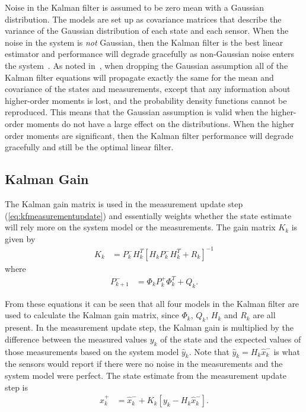Noise in the Kalman filter is assumed to be zero mean with a Gaussian distribution.
The models are set up as covariance matrices that describe the variance of the Gaussian distribution of each state and each sensor.
When the noise in the system is \textit{not} Gaussian, then the Kalman filter is the best linear estimator and performance will degrade gracefully as non-Gaussian noise enters the system~\cite{Simon10}.
As noted in~\cite{AndersonMoore79}, when dropping the Gaussian assumption all of the Kalman filter equations will propagate exactly the same for the mean and covariance of the states and measurements, except that any information about higher-order moments is lost, and the probability density functions cannot be reproduced.
This means that the Gaussian assumption is valid when the higher-order moments do not have a large effect on the distributions.
When the higher order moments are significant, then the Kalman filter performance will degrade gracefully and still be the optimal linear filter.

\subsection{Kalman Gain}%
\label{kfKalmanGain}
The Kalman gain matrix is used in the measurement update step (\ref{eq:kfmeasurementupdate}) and essentially weights whether the state estimate will rely more on the system model or the measurements.
The gain matrix $K_k$ is given by
\begin{align*}
K_k &= P_k^- H_k^T {\left[H_k P_k^- H_k^T + R_k\right]}^{-1}
\end{align*}
where
\begin{align*}
P_{k+1}^- &= \Phi_k P_k^+\Phi_k^T + Q_k.
\end{align*}

From these equations it can be seen that all four models in the Kalman filter are used to calculate the Kalman gain matrix, since $\Phi_k$, $Q_k$, $H_k$ and $R_k$ are all present.
In the measurement update step, the Kalman gain is multiplied by the difference between the measured values $y_k$ of the state and the expected values of those measurements based on the system model $\hat{y}_k$.
Note that $\hat{y}_k = H_k\hat{x}_k^-$ is what the sensors would report if there were no noise in the measurements and the system model were perfect.
The state estimate from the measurement update step is
\begin{align*}
\hat{x}_k^+ &= \hat{x}_k^- + K_k\left[y_k - H_k\hat{x}_k^-\right].
\end{align*}

